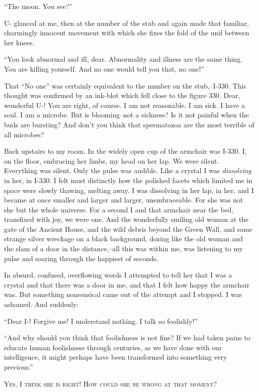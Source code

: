 \documentclass[11pt,openany]{book}
\begin{document}
``The moon. You see?''

U- glanced at me, then at the number of the stub and again made that familiar, charmingly innocent movement with which she fixes the fold of the unif between her knees.

``You look abnormal and ill, dear. Abnormality and illness are the same thing. You are killing yourself. And no one would tell you that, no one!''

That ``No one'' was certainly equivalent to the number on the stub,--I-330. This thought was confirmed by an ink-blot which fell close to the figure 330. Dear, wonderful U-! You are right, of course. I am not reasonable. I am sick. I have a soul. I am a microbe. But is blooming--not a sickness? Is it not painful when the buds are bursting? And don't you think that spermatozoa are the most terrible of all microbes?

Back upstairs to my room. In the widely open cup of the armchair was I-330. I, on the floor, embracing her limbs, my head on her lap. We were silent. Everything was silent. Only the pulse was audible. Like a crystal I was \emph{dissolving} in her, in I-330. I felt most distinctly how the polished facets which limited me in space were slowly thawing, melting away. I was dissolving in her lap, in her, and I became at once smaller and larger and larger, unembraceable. For she was not she but the whole universe. For a second I and that armchair near the bed, transfixed with joy, we were one. And the wonderfully smiling old woman at the gate of the Ancient House, and the wild debris beyond the Green Wall, and some strange silver wreckage on a black background, dozing like the old woman and the slam of a door in the distance,--all this was within me, was listening to my pulse and soaring through the happiest of seconds.

In absurd, confused, overflowing words I attempted to tell her that I was a crystal and that there was a door in me, and that I felt how happy the armchair was. But something nonsensical came out of the attempt and I stopped. I was ashamed. And suddenly:

``Dear I-! Forgive me! I understand nothing. I talk so foolishly!''

``And why should you think that foolishness is not fine? If we had taken pains to educate human foolishness through centuries, as we have done with our intelligence, it might perhaps have been transformed into something very precious.''

\begin{center}\textsc{Yes, I think she is right! How could she be wrong at that moment?}\end{center}
\end{document}
